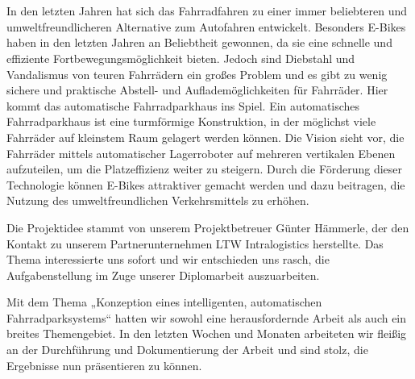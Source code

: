 \section*{}
In den letzten Jahren hat sich das Fahrradfahren zu einer immer beliebteren und umweltfreundlicheren Alternative zum Autofahren entwickelt. Besonders E-Bikes haben in den letzten Jahren an Beliebtheit gewonnen, da sie eine schnelle und effiziente Fortbewegungsmöglichkeit bieten. Jedoch sind Diebstahl und Vandalismus von teuren Fahrrädern ein großes Problem und es gibt zu wenig sichere und praktische Abstell- und Auflademöglichkeiten für Fahrräder. Hier kommt das automatische Fahrradparkhaus ins Spiel. Ein automatisches Fahrradparkhaus ist eine turmförmige Konstruktion, in der möglichst viele Fahrräder auf kleinstem Raum gelagert werden können. Die Vision sieht vor, die Fahrräder mittels automatischer Lagerroboter auf mehreren vertikalen Ebenen aufzuteilen, um die Platzeffizienz weiter zu steigern. Durch die Förderung dieser Technologie können E-Bikes attraktiver gemacht werden und dazu beitragen, die Nutzung des umweltfreundlichen Verkehrsmittels zu erhöhen.

\smallskip \noindent Die Projektidee stammt von unserem Projektbetreuer Günter Hämmerle, der den Kontakt zu unserem Partnerunternehmen LTW Intralogistics herstellte. Das Thema interessierte uns sofort und wir entschieden uns rasch, die Aufgabenstellung im Zuge unserer Diplomarbeit auszuarbeiten.

\smallskip \noindent Mit dem Thema „Konzeption eines intelligenten, automatischen Fahrradparksystems“ hatten wir sowohl eine herausfordernde Arbeit als auch ein breites Themengebiet. In den letzten Wochen und Monaten arbeiteten wir fleißig an der Durchführung und Dokumentierung der Arbeit und sind stolz, die Ergebnisse nun präsentieren zu können.